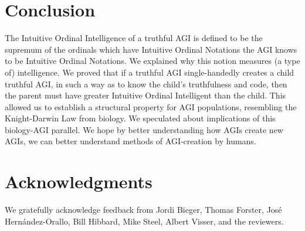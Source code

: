\documentclass[runningheads]{llncs}
\begin{document}

\section{Conclusion}
\label{conclusionsection}

The Intuitive Ordinal Intelligence of a truthful AGI is defined to be the supremum of the
ordinals which have Intuitive Ordinal Notations the AGI knows to be Intuitive Ordinal
Notations. We explained why this notion measures (a type of) intelligence.
We proved that if a truthful AGI single-handedly creates
a child truthful AGI, in such a way as to know the child's truthfulness and code,
then the parent must have greater Intuitive Ordinal Intelligent than the child. This
allowed us to establish a structural property for AGI populations,
resembling the Knight-Darwin
Law from biology. We speculated about implications of this biology-AGI parallel.
We hope by better understanding
how AGIs create new AGIs, we can better
understand methods of AGI-creation by humans.

\section*{Acknowledgments}

We gratefully acknowledge feedback from Jordi Bieger, Thomas Forster, Jos{\'e} Hern{\'a}ndez-Orallo,
Bill Hibbard, Mike Steel,
Albert Visser, and the reviewers.



\end{document}
